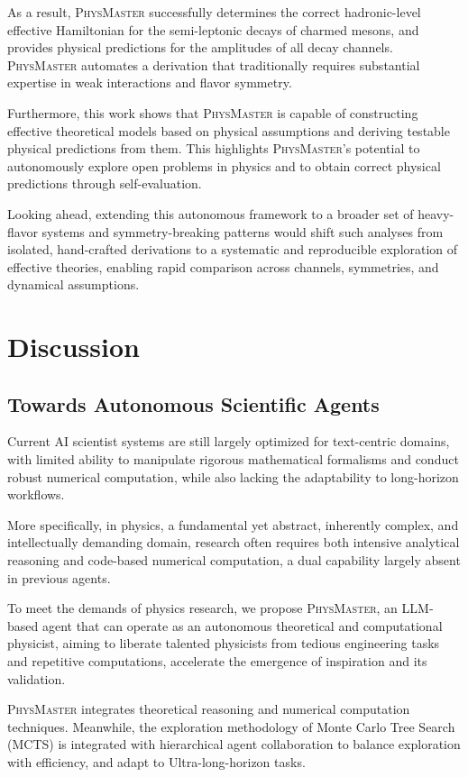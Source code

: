 \documentclass[11pt, a4paper, logo, copyright, nonumbering]{SAI}
\newcommand{\agent}{\textsc{PhysMaster}\xspace}
\begin{document}
As a result, \agent successfully determines the correct hadronic-level effective Hamiltonian for the semi-leptonic decays of charmed mesons, and provides physical predictions for the amplitudes of all decay channels. \agent automates a derivation that traditionally requires substantial expertise in weak interactions and flavor symmetry.

Furthermore, this work shows that \agent is capable of constructing effective theoretical models based on physical assumptions and deriving testable physical predictions from them. This highlights \agent’s potential to autonomously explore open problems in physics and to obtain correct physical predictions through self-evaluation.

Looking ahead, extending this autonomous framework to a broader set of heavy-flavor systems and symmetry-breaking patterns would shift such analyses from isolated, hand-crafted derivations to a systematic and reproducible exploration of effective theories, enabling rapid comparison across channels, symmetries, and dynamical assumptions.

\section{Discussion}
\label{sec:dis}

\subsection{Towards Autonomous Scientific Agents}
\label{sec:dis-conclusion}
Current AI scientist systems are still largely optimized for text-centric domains, with limited ability to manipulate rigorous mathematical formalisms and conduct robust numerical computation, while also lacking the adaptability to long-horizon workflows.

More specifically, in physics, a fundamental yet abstract, inherently complex, and intellectually demanding domain, research often requires both intensive analytical reasoning and code-based numerical computation, a dual capability largely absent in previous agents.

To meet the demands of physics research, we propose \agent, an LLM-based agent that can operate as an autonomous theoretical and computational physicist, aiming to liberate talented physicists from tedious engineering tasks and repetitive computations, accelerate the emergence of inspiration and its validation. 

\agent integrates theoretical reasoning and numerical computation techniques. Meanwhile, the exploration methodology of Monte Carlo Tree Search (MCTS) is integrated with hierarchical agent collaboration to balance exploration with efficiency, and adapt to Ultra-long-horizon tasks.
\end{document}
